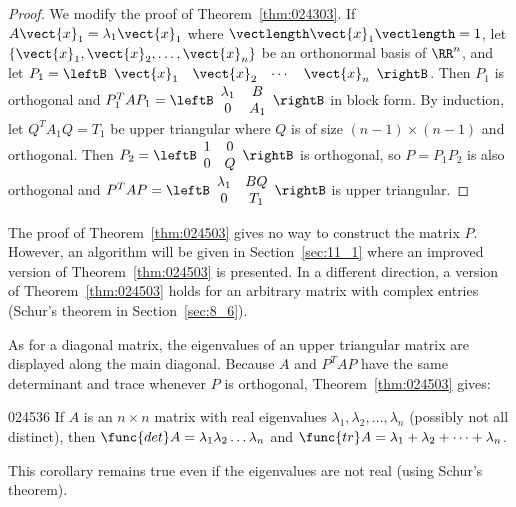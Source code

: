 \begin{proof}
We modify the proof of Theorem~\ref{thm:024303}. If $A\vect{x}_{1} = \lambda_{1}\vect{x}_{1}$ where $\vectlength\vect{x}_{1}\vectlength = 1$, let $\{\vect{x}_{1}, \vect{x}_{2}, \dots, \vect{x}_{n}\}$ be an orthonormal basis of $\RR^n$, and let $P_{1} = \leftB \begin{array}{cccc}
\vect{x}_{1} & \vect{x}_{2} & \cdots &  \vect{x}_{n}
\end{array}\rightB$. Then $P_{1}$ is orthogonal and $P_{1}^TAP_{1} = \leftB \begin{array}{cc}
\lambda_{1} & B \\
0 & A_{1}
\end{array}\rightB$ in block form. By induction, let $Q^{T}A_{1}Q = T_{1}$ be upper triangular where $Q$ is of size $(n-1)\times(n-1)$ and orthogonal. Then $P_{2} = \leftB \begin{array}{cc}
1 & 0 \\
0 & Q
\end{array}\rightB$ is orthogonal, so $P = P_{1}P_{2}$ is also orthogonal and $P^TAP = \leftB \begin{array}{cc}
\lambda_{1} & BQ \\
0 & T_{1}
\end{array}\rightB$
 is upper triangular.
\end{proof}

\noindent The proof of Theorem~\ref{thm:024503} gives no way to construct the matrix $P$. However, an algorithm will be given in Section~\ref{sec:11_1} where an improved version of Theorem~\ref{thm:024503} is presented. In a different direction, a version of Theorem~\ref{thm:024503} holds for an arbitrary matrix with complex entries (Schur's theorem in Section~\ref{sec:8_6}).


As for a diagonal matrix, the eigenvalues of an upper triangular matrix are displayed along the main diagonal. Because $A$ and $P^{T}AP$ have the same determinant and trace whenever $P$ is orthogonal, Theorem~\ref{thm:024503} gives:


\begin{corollary}{}{024536}
If $A$ is an $n \times n$ matrix with real eigenvalues $\lambda_{1}, \lambda_{2}, \dots, \lambda_{n}$ (possibly not all distinct), then $\func{det}A = \lambda_{1}\lambda_{2} \dots \lambda_{n}$ and $\func{tr}A = \lambda_{1} + \lambda_{2} + \dots  + \lambda_{n}$.
\end{corollary}

\noindent This corollary remains true even if the eigenvalues are not real (using Schur's theorem).

